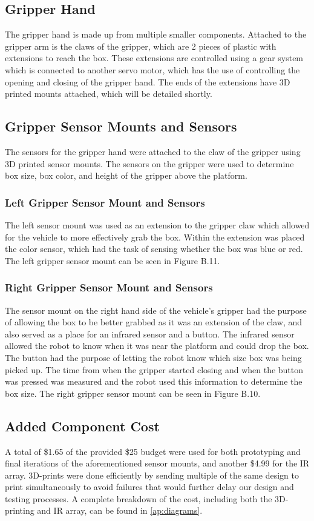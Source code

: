 \documentclass[11pt]{report}
\begin{document}
\subsection{Gripper Hand}
The gripper hand is made up from multiple smaller components. Attached to the gripper arm is the claws of the gripper, which are 2 pieces of plastic with extensions to reach the box. These extensions are controlled using a gear system which is connected to another servo motor, which has the use of controlling the opening and closing of the gripper hand. The ends of the extensions have 3D printed mounts attached, which will be detailed shortly. 
\subsection{Gripper Sensor Mounts and Sensors}
The sensors for the gripper hand were attached to the claw of the gripper using 3D printed sensor mounts. The sensors on the gripper were used to determine box size, box color, and height of the gripper above the platform. 
\subsubsection{Left Gripper Sensor Mount and Sensors}
The left sensor mount was used as an extension to the gripper claw which allowed for the vehicle to more effectively grab the box. Within the extension was placed the color sensor, which had the task of sensing whether the box was blue or red. The left gripper sensor mount can be seen in Figure B.11.
\subsubsection{Right Gripper Sensor Mount and Sensors}
The sensor mount on the right hand side of the vehicle’s gripper had the purpose of allowing the box to be better grabbed as it was an extension of the claw, and also served as a place for an infrared sensor and a button. The infrared sensor allowed the robot to know when it was near the platform and could drop the box. The button had the purpose of letting the robot know which size box was being picked up. The time from when the gripper started closing and when the button was pressed was measured and the robot used this information to determine the box size. The right gripper sensor mount can be seen in Figure B.10.

\subsection{Added Component Cost}
A total of \$1.65 of the provided \$25 budget were used for both prototyping and final iterations of the aforementioned sensor mounts, and another \$4.99 for the \gls{IR} array. 3D-prints were done efficiently by sending multiple of the same design to print simultaneously to avoid failures that would further delay our design and testing processes. A complete breakdown of the cost, including both the 3D-printing and \gls{IR} array, can be found in \cref{ap:diagrams}.
\end{document}
